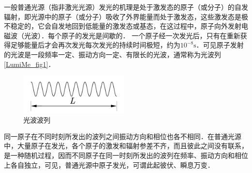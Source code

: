 
一般普通光源（指非激光光源）发光的机理是处于激发态的原子（或分子）的自发辐射，即光源中的原子（或分子）吸收了外界能量而处于激发态，这些激发态是极不稳定的，它会自发地回到低能量的激发态或基态，在这过程中，原子向外发射电磁波（光波）．每个原子的发光是间歇的． 一个原子经一次发光后，只有在重新获得足够能量后才会再次发光每次发光的持续时间极短，约为$10^{-8}\mathrm s$．可见原子发射的光波是一段频率一定、振动方向一定、有限长的光波，通常称为光波列\autoref{LumiMe_fig1}．
\begin{figure}[ht]
\centering
\includegraphics[width=5.5cm]{./figures/LumiMe_1.png}
\caption{光波波列} \label{LumiMe_fig1}
\end{figure}

同一原子在不同时刻所发出的波列之间振动方向和相位也各不相同．在普通光源中，大量原子在发光，各个原子的激发和辐射参差不齐，而且彼此之间没有联系，是一种随机过程，因而不同原子在同一时刻所发出的波列在频率、振动方向和相位上各自独立，可见，普通光源中原子发光，可谓此起彼伏、瞬息万变．